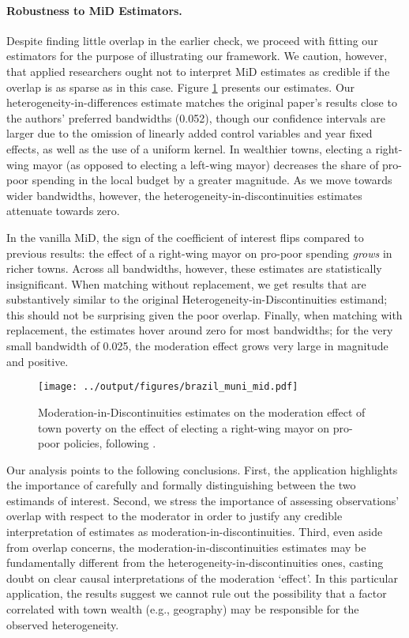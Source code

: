 \documentclass[12pt]{article}
\begin{document}
\paragraph*{Robustness to MiD Estimators.} Despite finding little overlap in the earlier check, we proceed with fitting our estimators for the purpose of illustrating our framework. We caution, however, that applied researchers ought not to interpret MiD estimates as credible if the overlap is as sparse as in this case. Figure \ref{fig:brazil_mid} presents our estimates. Our heterogeneity-in-differences estimate matches the original paper's results close to the authors' preferred bandwidths (0.052), though our confidence intervals are larger due to the omission of linearly added control variables and year fixed effects, as well as the use of a uniform kernel. In wealthier towns, electing a right-wing mayor (as opposed to electing a left-wing mayor) decreases the share of pro-poor spending in the local budget by a greater magnitude. As we move towards wider bandwidths, however, the heterogeneity-in-discontinuities estimates attenuate towards zero.

In the vanilla MiD, the sign of the coefficient of interest flips compared to previous results: the effect of a right-wing mayor on pro-poor spending \emph{grows} in richer towns. Across all bandwidths, however, these estimates are statistically insignificant. When matching without replacement, we get results that are substantively similar to the original Heterogeneity-in-Discontinuities estimand; this should not be surprising given the poor overlap. Finally, when matching with replacement, the estimates hover around zero for most bandwidths; for the very small bandwidth of 0.025, the moderation effect grows very large in magnitude and positive.

\begin{figure}[htbp]
  \centering
  \texttt{[image: ../output/figures/brazil\_muni\_mid.pdf]}
  \caption{Moderation-in-Discontinuities estimates on the moderation effect of town poverty on the effect of electing a right-wing mayor on pro-poor policies, following \citet*{desai2021}.}
  \label{fig:brazil_mid}
\end{figure}
 
Our analysis points to the following conclusions. First, the application highlights the importance of carefully and formally distinguishing between the two estimands of interest. Second, we stress the importance of assessing observations' overlap with respect to the moderator in order to justify any credible interpretation of estimates as moderation-in-discontinuities. Third, even aside from overlap concerns, the moderation-in-discontinuities estimates may be fundamentally different from the heterogeneity-in-discontinuities ones, casting doubt on clear causal interpretations of the moderation `effect'. In this particular application, the results suggest we cannot rule out the possibility that a factor correlated with town wealth (e.g., geography) may be responsible for the observed heterogeneity.
\end{document}
